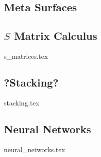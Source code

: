 \subsection{Meta Surfaces} \label{sec:MS}

\subsection{$S$ Matrix Calculus}
{s_matrices.tex}

\subsection{?Stacking?}
{stacking.tex}

\subsection{Neural Networks}
{neural_networks.tex}
